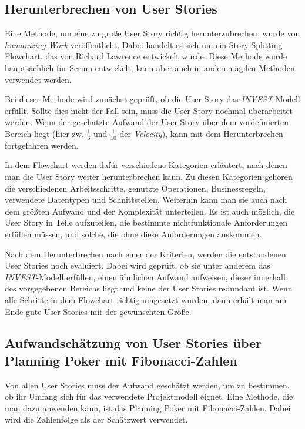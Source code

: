 \documentclass[acmtog]{acmart}
\begin{document}
\subsection{Herunterbrechen von User Stories} \label{sec:breakedown}

Eine Methode, um eine zu große User Story richtig herunterzubrechen, wurde von \emph{humanizing Work} veröffentlicht. Dabei handelt es sich um ein Story
Splitting Flowchart, das von Richard Lawrence entwickelt wurde. Diese Methode wurde hauptsächlich für Scrum entwickelt, kann aber auch
in anderen agilen Methoden verwendet werden. \cite{humanizingwork}

Bei dieser Methode wird zunächst geprüft, ob die User Story das \emph{INVEST}-Modell erfüllt. Sollte dies nicht der Fall sein, muss die User Story nochmal
überarbeitet werden. Wenn der geschätzte Aufwand der User Story über dem vordefinierten Bereich liegt (hier zw. \( \frac{1}{6} \) und \( \frac{1}{10} \) der \emph{Velocity}), kann mit dem Herunterbrechen
fortgefahren werden. \cite{humanizingwork}

In dem Flowchart werden dafür verschiedene Kategorien erläutert, nach denen man die User Story weiter herunterbrechen kann. Zu diesen Kategorien
gehören die verschiedenen Arbeitsschritte, genutzte Operationen, Businessregeln, verwendete Datentypen und Schnittstellen. Weiterhin kann man sie auch nach dem größten
Aufwand und der Komplexität unterteilen. Es ist auch möglich, die User Story in Teile aufzuteilen, die bestimmte nichtfunktionale Anforderungen erfüllen müssen,
und solche, die ohne diese Anforderungen auskommen. \cite{humanizingwork}

Nach dem Herunterbrechen nach einer der Kriterien, werden die entstandenen User Stories noch evaluiert. Dabei wird geprüft, ob sie unter anderem das \emph{INVEST}-Modell erfüllen, einen
ähnlichen Aufwand aufweisen, dieser innerhalb des vorgegebenen Bereichs liegt und keine der User Stories redundant ist. Wenn alle Schritte in dem Flowchart richtig umgesetzt wurden,
dann erhält man am Ende gute User Stories mit der gewünschten Größe. \cite{humanizingwork}

\subsection{Aufwandschätzung von User Stories über Planning Poker mit Fibonacci-Zahlen} \label{sec:effort}

Von allen User Stories muss der Aufwand geschätzt werden, um zu bestimmen, ob ihr Umfang sich für das verwendete Projektmodell eignet.
Eine Methode, die man dazu anwenden kann, ist das Planning Poker mit Fibonacci-Zahlen. Dabei wird die Zahlenfolge als der Schätzwert verwendet. \cite{planingpoker}
\end{document}
